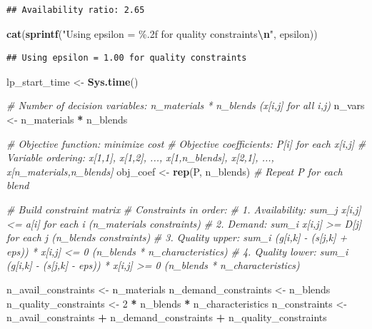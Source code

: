 \documentclass[
]{article}
\newenvironment{Shaded}{\begin{snugshade}}{\end{snugshade}}
\newcommand{\CommentTok}[1]{\textcolor[rgb]{0.56,0.35,0.01}{\textit{#1}}}
\newcommand{\DecValTok}[1]{\textcolor[rgb]{0.00,0.00,0.81}{#1}}
\newcommand{\FunctionTok}[1]{\textcolor[rgb]{0.13,0.29,0.53}{\textbf{#1}}}
\newcommand{\NormalTok}[1]{#1}
\newcommand{\OtherTok}[1]{\textcolor[rgb]{0.56,0.35,0.01}{#1}}
\newcommand{\SpecialCharTok}[1]{\textcolor[rgb]{0.81,0.36,0.00}{\textbf{#1}}}
\newcommand{\StringTok}[1]{\textcolor[rgb]{0.31,0.60,0.02}{#1}}
\begin{document}
\begin{verbatim}
## Availability ratio: 2.65
\end{verbatim}

\begin{Shaded}
\begin{Highlighting}[]
\FunctionTok{cat}\NormalTok{(}\FunctionTok{sprintf}\NormalTok{(}\StringTok{"Using epsilon = \%.2f for quality constraints}\SpecialCharTok{\textbackslash{}n}\StringTok{"}\NormalTok{, epsilon))}
\end{Highlighting}
\end{Shaded}

\begin{verbatim}
## Using epsilon = 1.00 for quality constraints
\end{verbatim}

\begin{Shaded}
\begin{Highlighting}[]
\NormalTok{lp\_start\_time }\OtherTok{\textless{}{-}} \FunctionTok{Sys.time}\NormalTok{()}

\CommentTok{\# Number of decision variables: n\_materials * n\_blends (x[i,j] for all i,j)}
\NormalTok{n\_vars }\OtherTok{\textless{}{-}}\NormalTok{ n\_materials }\SpecialCharTok{*}\NormalTok{ n\_blends}

\CommentTok{\# Objective function: minimize cost}
\CommentTok{\# Objective coefficients: P[i] for each x[i,j]}
\CommentTok{\# Variable ordering: x[1,1], x[1,2], ..., x[1,n\_blends], x[2,1], ..., x[n\_materials,n\_blends]}
\NormalTok{obj\_coef }\OtherTok{\textless{}{-}} \FunctionTok{rep}\NormalTok{(P, n\_blends)  }\CommentTok{\# Repeat P for each blend}

\CommentTok{\# Build constraint matrix}
\CommentTok{\# Constraints in order:}
\CommentTok{\# 1. Availability: sum\_j x[i,j] \textless{}= a[i] for each i (n\_materials constraints)}
\CommentTok{\# 2. Demand: sum\_i x[i,j] \textgreater{}= D[j] for each j (n\_blends constraints)  }
\CommentTok{\# 3. Quality upper: sum\_i (g[i,k] {-} (s[j,k] + eps)) * x[i,j] \textless{}= 0 (n\_blends * n\_characteristics)}
\CommentTok{\# 4. Quality lower: sum\_i (g[i,k] {-} (s[j,k] {-} eps)) * x[i,j] \textgreater{}= 0 (n\_blends * n\_characteristics)}

\NormalTok{n\_avail\_constraints }\OtherTok{\textless{}{-}}\NormalTok{ n\_materials}
\NormalTok{n\_demand\_constraints }\OtherTok{\textless{}{-}}\NormalTok{ n\_blends}
\NormalTok{n\_quality\_constraints }\OtherTok{\textless{}{-}} \DecValTok{2} \SpecialCharTok{*}\NormalTok{ n\_blends }\SpecialCharTok{*}\NormalTok{ n\_characteristics}
\NormalTok{n\_constraints }\OtherTok{\textless{}{-}}\NormalTok{ n\_avail\_constraints }\SpecialCharTok{+}\NormalTok{ n\_demand\_constraints }\SpecialCharTok{+}\NormalTok{ n\_quality\_constraints}


\end{Highlighting}
\end{Shaded}
\end{document}
